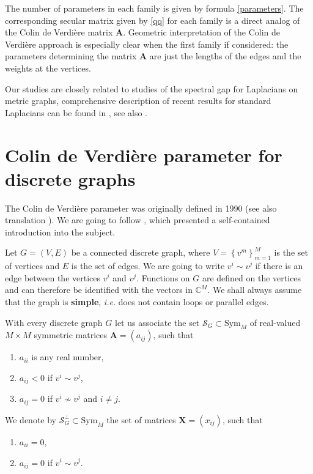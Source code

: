\documentclass{amsart}
\theoremstyle{definition}
\theoremstyle{remark}
\numberwithin{equation}{section}
\newcommand{\Sc}{\mathcal{S}}
\newcommand{\sym}{\text{Sym}}
\begin{document}
The number of parameters in each family is given by formula \eqref{parameters}.
 The corresponding secular matrix given by \eqref{qq} for each family is a direct analog of the Colin de Verdi\`ere matrix $ \mathbf A$.
Geometric interpretation of the Colin de Verdi\`ere approach is especially clear when the first family if considered:
the parameters determining the matrix $ \mathbf A $ are just the lengths of the edges and the weights at the vertices.


 
 Our studies are closely related to studies of the spectral gap for Laplacians on metric graphs, comprehensive description of recent results for standard Laplacians can be found in 
 \cites{Nic1,Nic2,Fr,KuNa14,KeKuMaMu,BeKeKuMu23,BeKeKuMu17,BeKeKuMu19}, see also \cite[Chapter 12]{PK24}.





\section{Colin de Verdi{\`e}re parameter for discrete graphs} \label{SecCdV}


The Colin de Verdi{\`e}re parameter was originally defined in 1990 \cite{YC90} (see also translation \cite{YC93}). We are going to follow \cite{HV99}, which presented
a self-contained introduction into the subject.


Let $G=(V,E)$ be a connected discrete graph, where $V = \left\{ v^m \right\}_{m=1}^M $ is the set of vertices   and $ E $ is the set of edges.
We are going to write $ v^i \sim v^j $ if there is an edge between the vertices $ v^i $ and $ v^j$. Functions on $ G $ are defined on the vertices and can
therefore be identified with the vectors in $ \mathbb C^M$. We shall always assume that the graph is {\bf simple}, {\it i.e.} does not contain loops or
parallel edges.

With every discrete graph $ G $ 
let us associate  the set $\Sc_G\subset \sym_M$ of real-valued $ M \times M $ symmetric
 matrices $\mathbf{A}=(a_{ij})$, such that 
\begin{enumerate}
\item $a_{ii}$ is any real number,
\item $a_{ij} < 0$ if $ v^i\sim v^j$,
\item $a_{ij}=0$ if $v^i\not\sim v^j$ and $i\neq j$.
\end{enumerate}
We denote by 
$\Sc_G^\perp \subset \sym_M$ the set of matrices $ \mathbf X = (x_{ij}) $, such that
\begin{enumerate}
\item $a_{ii} = 0$,
\item $a_{ij} = 0$ if $ v^i\sim v^j$.
\end{enumerate}
\end{document}
